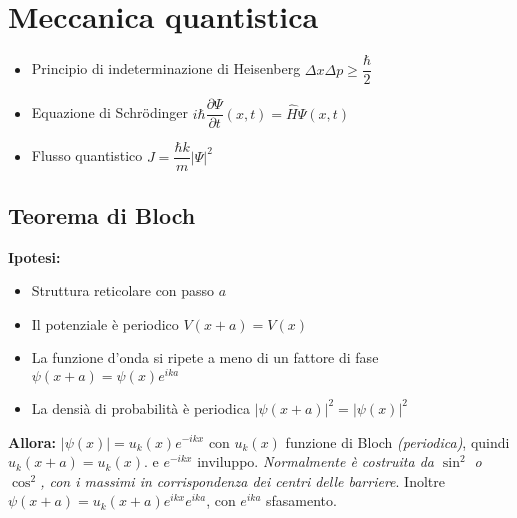 \documentclass{article}
\begin{document}
\newpage

\section{Meccanica quantistica}
\begin{itemize}
  \item Principio di indeterminazione di Heisenberg \( \Delta x \Delta p \geq \dfrac{\hbar}{2} \)
  \item Equazione di Schrödinger \( i \hbar \dfrac{\partial \Psi}{\partial t} (x, t) = \hat{H} \Psi (x,t) \)
  \item Flusso quantistico \( J = \dfrac{\hbar k}{m} \left| \Psi \right| ^ 2 \)
\end{itemize}

\subsection{Teorema di Bloch}
\textbf{Ipotesi:}
\begin{itemize}
  \item Struttura reticolare con passo \( a \)
  \item Il potenziale è periodico \( V(x+a) = V(x) \)
  \item La funzione d'onda si ripete a meno di un fattore di fase \( \psi(x+a) = \psi(x) e^{ i k  a} \)
  \item La densià di probabilità è periodica \( \left| \psi(x+a) \right|^2 = \left| \psi(x)  \right|^2 \)
\end{itemize}
\textbf{Allora:} \( \left| \psi(x) \right| = u_k(x) e^{ -ikx } \) con \( u_k(x) \) funzione di Bloch \textit{(periodica)}, quindi \( u_k (x+a) = u_k(x).\) e \( e^{ -ikx } \) inviluppo. \newline \textit{Normalmente è costruita da \(\sin^2\) o \(\cos^2\), con i massimi in corrispondenza dei centri delle barriere}. \newline
Inoltre \( \psi(x+a) = u_k (x+a) e^{ikx} e^{ika} \), con \( e^{ika} \) sfasamento.
\end{document}
